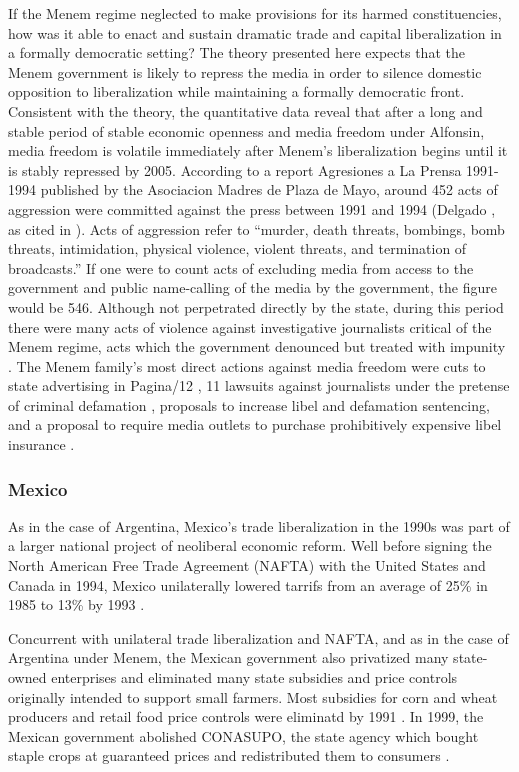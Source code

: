 \documentclass[a4paper]{article}\usepackage[]{graphicx}\usepackage[]{color}
\begin{document}
If the Menem regime neglected to make provisions for its harmed constituencies, how was it able to enact and sustain dramatic trade and capital liberalization in a formally democratic setting? The theory presented here expects that the Menem government is likely to repress the media in order to silence domestic opposition to liberalization while maintaining a formally democratic front. Consistent with the theory, the quantitative data reveal that after a long and stable period of stable economic openness and media freedom under Alfonsin, media freedom is volatile immediately after Menem's liberalization begins until it is stably repressed by 2005. According to a report Agresiones a La Prensa 1991-1994 published by the Asociacion Madres de Plaza de Mayo, around 452 acts of aggression were committed against the press between 1991 and 1994 (Delgado \cite*{Delgado:1995tr}, as cited in \cite[247]{Park:2002io}). Acts of aggression refer to “murder, death threats, bombings, bomb threats, intimidation, physical violence, violent threats, and termination of broadcasts.” If one were to count acts of excluding media from access to the government and public name-calling of the media by the government, the figure would be 546. Although not perpetrated directly by the state, during this period there were many acts of violence against investigative journalists critical of the Menem regime, acts which the government denounced but treated with impunity \parencite{Long:1993wb}. The Menem family's most direct actions against media freedom were cuts to state advertising in Pagina/12 \parencite[27]{Waisbord:1994kq}, 11 lawsuits against journalists under the pretense of criminal defamation \parencite{McCullough:1991cs}, proposals to increase libel and defamation sentencing, and a proposal to require media outlets to purchase prohibitively expensive libel insurance \parencite{Sims:kgMPqAHd}.

\subsubsection{Mexico}

As in the case of Argentina, Mexico's trade liberalization in the 1990s was part of a larger national project of neoliberal economic reform. Well before signing the North American Free Trade Agreement (NAFTA) with the United States and Canada in 1994, Mexico unilaterally lowered tarrifs from an average of 25\% in 1985 to 13\% by 1993 \parencites{McDaniel:2003kw}.

Concurrent with unilateral trade liberalization and NAFTA, and as in the case of Argentina under Menem, the Mexican government also privatized many state-owned enterprises and eliminated many state subsidies and price controls originally intended to support small farmers. Most subsidies for corn and wheat producers and retail food price controls were eliminatd by 1991 \parencite[295]{Hufbauer:2005vh}. In 1999, the Mexican government abolished CONASUPO, the state agency which bought staple crops at guaranteed prices and redistributed them to consumers \parencite[12]{Villareal:2010vk}.
\end{document}
